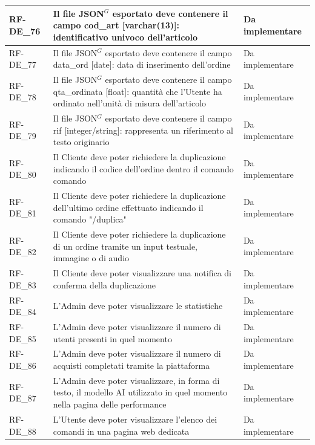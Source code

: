\begin{longtable}{|>{\raggedright}p{}|>{\raggedright\arraybackslash}p{}|>{\raggedright\arraybackslash}p{}|}
	\hline
	RF-DE\_76 \hypertarget{rf-de_76} & Il file JSON$^G$ esportato deve contenere il campo cod\_art [varchar(13)]: identificativo univoco dell'articolo & Da implementare \\
	\hline
	RF-DE\_77 \hypertarget{rf-de_77} & Il file JSON$^G$ esportato deve contenere il campo data\_ord [date]: data di inserimento dell'ordine & Da implementare \\
	\hline
	RF-DE\_78 \hypertarget{rf-de_78} & Il file JSON$^G$ esportato deve contenere il campo qta\_ordinata [float]: quantità che l'Utente ha ordinato nell'unità di misura dell'articolo & Da implementare \\
	\hline
	RF-DE\_79 \hypertarget{rf-de_79} & Il file JSON$^G$ esportato deve contenere il campo rif [integer/string]: rappresenta un riferimento al testo originario & Da implementare \\
	\hline
	RF-DE\_80 \hypertarget{rf-de_80} & Il Cliente deve poter richiedere la duplicazione indicando il codice dell'ordine dentro il comando comando \vr{/duplica\{xx\}} & Da implementare \\
	\hline
	RF-DE\_81 \hypertarget{rf-de_81} & Il Cliente deve poter richiedere la duplicazione dell'ultimo ordine effettuato indicando il comando "/duplica" & Da implementare \\
	\hline
	RF-DE\_82 \hypertarget{rf-de_82} & Il Cliente deve poter richiedere la duplicazione di un ordine tramite un input testuale, immagine o di audio & Da implementare \\
	\hline
	RF-DE\_83 \hypertarget{rf-de_83} & Il Cliente deve poter visualizzare una notifica di conferma della duplicazione & Da implementare \\
	\hline
	RF-DE\_84 \hypertarget{rf-de_84} & L'Admin deve poter visualizzare le statistiche & Da implementare \\
	\hline
	RF-DE\_85 \hypertarget{rf-de_85} & L'Admin deve poter visualizzare il numero di utenti presenti in quel momento & Da implementare \\
	\hline
	RF-DE\_86 \hypertarget{rf-de_86} & L'Admin deve poter visualizzare il numero di acquisti completati tramite la piattaforma & Da implementare \\
	\hline
	RF-DE\_87 \hypertarget{rf-de_87} & L'Admin deve poter visualizzare, in forma di testo, il modello AI utilizzato in quel momento nella pagina delle performance & Da implementare \\
	\hline
	RF-DE\_88 \hypertarget{rf-de_88} & L'Utente deve poter visualizzare l'elenco dei comandi in una pagina web dedicata & Da implementare \\

\end{longtable}
